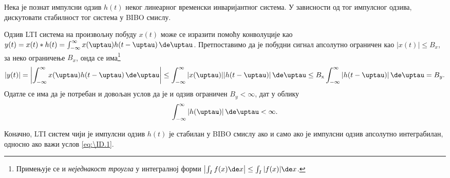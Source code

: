 \PID \label{z:bibo_imp} \mnImportant    
Нека је познат импулсни одзив $h(t)$ неког линеарног временски инваријантног система.
У зависности од тог импулсног одзива, дискутовати стабилност тог система у BIBO смислу.
\vspace*{2mm}

\RESENJE  Одзив LTI система на произвољну побуду $x(t)$ може се изразити 
помоћу конволуције као 
$y(t) = x(t) \ast h(t) = \int_{-\infty}^{\infty} x(\uptau) h(t - \uptau )\, \de \uptau$. Претпоставимо да је 
побудни сигнал апсолутно ограничен као $|x(t)| \leq B_{x}$, за неко ограничење $B_x$, онда се 
има\footnote{Примењује се и \textit{неједнакост троугла} у интегралној форми 
$\left\lvert \int_I f(x) \de x \right\rvert \leq \int_I |f(x)| \de x$.
} 
\begin{equation}
    |y(t)| = 
    \left\lvert
    \int_{-\infty}^{\infty} x(\uptau) h(t - \uptau )\, \de \uptau 
    \right\rvert \leq
    \int_{-\infty}^{\infty} |x(\uptau)| |h(t - \uptau )|\, \de \uptau \leq 
    B_{\rm x} \int_{-\infty}^{\infty} |h(t - \uptau )|\, \de \uptau = B_{y}.
\end{equation}
Одатле се има да је потребан и довољан услов да је и одзив ограничен $B_y < \infty$, дат у облику
\begin{equation}
\int_{-\infty}^{\infty} |h(\uptau )|\, \de \uptau < \infty. \label{eq:\ID.1}
\end{equation}

Коначно, LTI систем  чији је импулсни одзив $h(t)$ је стабилан у BIBO смислу ако и само ако је
импулсни одзив апсолутно интеграбилан, односно ако важи услов \eqref{eq:\ID.1}.

